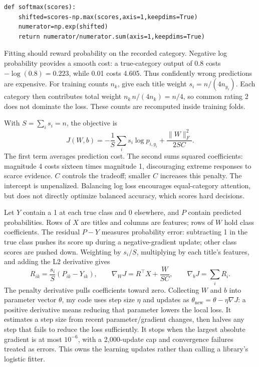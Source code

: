 \documentclass[11pt,letterpaper]{article}
\begin{document}
\begin{lstlisting}[caption={The manual forward pass converts relative class scores into stable softmax outputs.}]
def softmax(scores):
    shifted=scores-np.max(scores,axis=1,keepdims=True)
    numerator=np.exp(shifted)
    return numerator/numerator.sum(axis=1,keepdims=True)
\end{lstlisting}


Fitting should reward probability on the recorded category. Negative log probability provides a smooth cost: a true-category output of 0.8 costs $-\log(0.8)=0.223$, while 0.01 costs 4.605. Thus confidently wrong predictions are expensive. For training counts $n_k$, give each title weight $s_i=n/(4n_{y_i})$. Each category then contributes total weight $n_k\,n/(4n_k)=n/4$, so common rating 2 does not dominate the loss. These counts are recomputed inside training folds.

With $S=\sum_i s_i=n$, the objective is
\[
J(W,b)=-\frac1S\sum_i s_i\log p_{i,y_i}+\frac{\lVert W\rVert_F^2}{2SC}.
\]
The first term averages prediction cost. The second sums squared coefficients: magnitude 4 costs sixteen times magnitude 1, discouraging extreme responses to scarce evidence. $C$ controls the tradeoff; smaller $C$ increases this penalty. The intercept is unpenalized. Balancing log loss encourages equal-category attention, but does not directly optimize balanced accuracy, which scores hard decisions.

Let $Y$ contain a 1 at each true class and 0 elsewhere, and $P$ contain predicted probabilities. Rows of $X$ are titles and columns are features; rows of $W$ hold class coefficients. The residual $P-Y$ measures probability error: subtracting 1 in the true class pushes its score up during a negative-gradient update; other class scores are pushed down. Weighting by $s_i/S$, multiplying by each title's features, and adding the L2 derivative gives
\[
R_{ik}=\frac{s_i}{S}(P_{ik}-Y_{ik}),\qquad
\nabla_WJ=R^\top X+\frac{W}{SC},\qquad \nabla_bJ=\sum_iR_i.
\]
The penalty derivative pulls coefficients toward zero. Collecting $W$ and $b$ into parameter vector $\theta$, my code uses step size $\eta$ and updates as $\theta_{\mathrm{new}}=\theta-\eta\nabla J$: a positive derivative means reducing that parameter lowers the local loss. It estimates a step size from recent parameter/gradient changes, then halves any step that fails to reduce the loss sufficiently. It stops when the largest absolute gradient is at most $10^{-6}$, with a 2,000-update cap and convergence failures treated as errors. This owns the learning updates rather than calling a library's logistic fitter.
\end{document}

